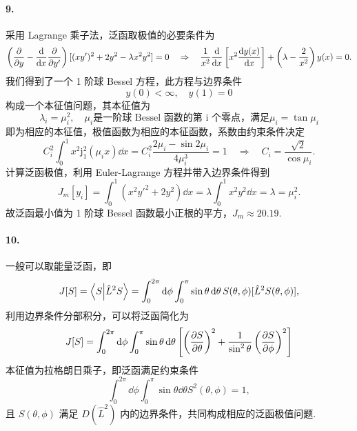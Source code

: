 \documentclass[12pt]{article}
\begin{document}
\paragraph{9.}
采用 Lagrange 乘子法，泛函取极值的必要条件为
\begin{equation*}
	\left(\pdv{y} - \dv{x} \pdv{y'}\right) [(xy')^2 + 2y^2 - \lambda x^2 y^2] = 0 \quad \Rightarrow \quad \frac{1}{x^2} \dv{x} \left[x^2 \dv{y(x)}{x}\right] + \left(\lambda - \frac{2}{x^2}\right) y(x) = 0.
\end{equation*}
我们得到了一个 1 阶球 Bessel 方程，此方程与边界条件
\begin{equation*}
	y(0) < \infty, \quad y(1) = 0
\end{equation*}
构成一个本征值问题，其本征值为
\begin{equation*}
	\lambda_i = \mu_i^2, \quad \mu_i \text{是一阶球 Bessel 函数的第 i 个零点，满足} \mu_i = \tan \mu_i
\end{equation*}
即为相应的本征值，极值函数为相应的本征函数，系数由约束条件决定
\begin{equation*}
	C_i^2 \int_{0}^{1} x^2 \mathrm{j}^2_1(\mu_i x) \dd{x} = C_i^2 \frac{2\mu_i - \sin 2\mu_i}{4\mu_i^3} = 1 \quad \Rightarrow \quad C_i = \frac{\sqrt{2}}{\cos \mu_i}.
\end{equation*}
计算泛函极值，利用 Euler-Lagrange 方程并带入边界条件得到
\begin{equation*}
	J_m[y_i] = \int_{0}^{1} (x^2 y'^2 + 2y^2) \dd{x} = \lambda \int_{0}^{1} x^2 y^2 \dd{x} = \lambda = \mu_i^2.
\end{equation*}
故泛函最小值为 1 阶球 Bessel 函数最小正根的平方，$J_m \approx 20.19$.

\paragraph{10.}
一般可以取能量泛函，即
\begin{equation*}
	J[S] = \braket{S}{\hat{L}^2 S} = \int_{0}^{2\pi} \dd{\phi} \int_{0}^{\pi} \sin \theta \dd{\theta} S(\theta, \phi) [\hat{L}^2 S(\theta, \phi)],
\end{equation*}
利用边界条件分部积分，可以将泛函简化为
\begin{equation*}
	J[S] = \int_{0}^{2\pi} \dd{\phi} \int_{0}^{\pi} \sin \theta \dd{\theta} \left[\left(\pdv{S}{\theta}\right)^2 + \frac{1}{\sin^2 \theta} \left(\pdv{S}{\phi}\right)^2\right]
\end{equation*}
本征值为拉格朗日乘子，即泛函满足约束条件
\begin{equation*}
	\int_{0}^{2\pi} \dd{\phi} \int_{0}^{\pi} \sin \theta \dd{\theta} S^2(\theta, \phi) = 1,
\end{equation*}
且 $S(\theta, \phi)$ 满足 $D\left(\hat{L}^2\right)$ 内的边界条件，共同构成相应的泛函极值问题.
\end{document}
